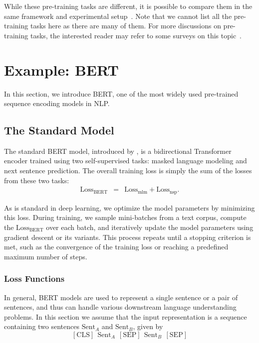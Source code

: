 While these pre-training tasks are different, it is possible to compare them in the same framework and experimental setup~\cite{dong-etal:2019unified,raffel-etal:2020exploring,lewis-etal:2020bart}. Note that we cannot list all the pre-training tasks here as there are many of them. For more discussions on pre-training tasks, the interested reader may refer to some surveys on this topic~\cite{qiu-etal:2020pre,han-etal:2021pre}.


\section{Example: BERT}

\noindent In this section, we introduce BERT, one of the most widely used pre-trained sequence encoding models in NLP.

\subsection{The Standard Model}

\noindent The standard BERT model, introduced by \citet{devlin-etal:2019bert}, is a bidirectional Transformer encoder trained using two self-supervised tasks: masked language modeling and next sentence prediction. The overall training loss is simply the sum of the losses from these two tasks:
\begin{eqnarray}
\mathrm{Loss}_{\mathrm{BERT}} & = & \mathrm{Loss}_{\mathrm{mlm}} + \mathrm{Loss}_{\mathrm{nsp}}.
\end{eqnarray}

\noindent As is standard in deep learning, we optimize the model parameters by minimizing this loss. During training, we sample mini-batches from a text corpus, compute the $\mathrm{Loss}_{\mathrm{BERT}}$ over each batch, and iteratively update the model parameters using gradient descent or its variants. This process repeats until a stopping criterion is met, such as the convergence of the training loss or reaching a predefined maximum number of steps.

\subsubsection{Loss Functions}

In general, BERT models are used to represent a single sentence or a pair of sentences, and thus can handle various downstream language understanding problems. In this section we assume that the input representation is a sequence containing two sentences $\mathrm{Sent}_{A}$ and $\mathrm{Sent}_{B}$, given by
\begin{equation}
\mathrm{[CLS]}\ \ \mathrm{Sent}_{A}\ \ \mathrm{[SEP]}\ \ \mathrm{Sent}_{B}\ \ \mathrm{[SEP]} \nonumber
\end{equation}

